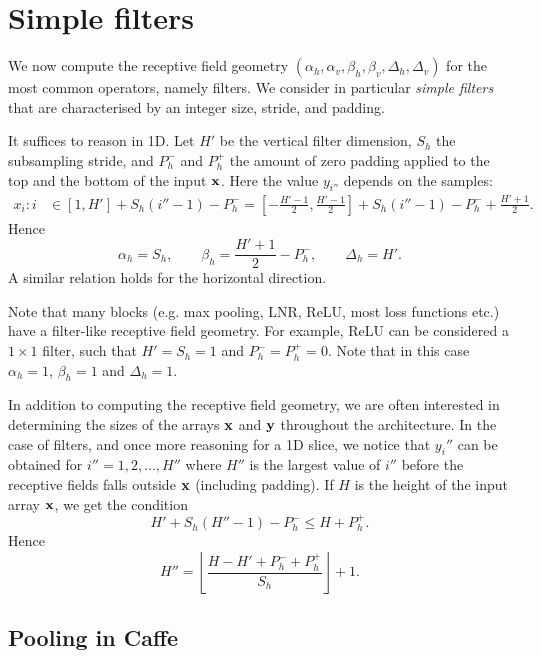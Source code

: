 \section{Simple filters}\label{s:receptive-simple-filters}

We now compute the receptive field geometry $(\alpha_h,\alpha_v,\beta_h,\beta_v,\Delta_h,\Delta_v)$ for the most common operators, namely filters. We consider in particular \emph{simple filters} that are characterised by an integer size, stride, and padding.

It suffices to reason in 1D.  Let $H'$ be the vertical filter dimension, $S_h$ the subsampling stride, and $P_h^-$ and $P_h^+$ the amount of zero padding applied to the top and the bottom of the input $\mathbf{x}$. Here the value $y_{i''}$ depends on the samples:
\begin{align*}
 x_i : i
 &\in
 [1, H'] + S_h (i'' - 1) - P_h^-
=
\left[-\frac{H'-1}{2}, \frac{H'-1}{2}\right] + S_h (i''-1) - P_h^- + \frac{H'+1}{2}.
\end{align*}
Hence
\[
\alpha_h = S_h,
\qquad
\beta _h = \frac{H'+1}{2} - P_h^-,
\qquad
\Delta_h = H'.
\]
A similar relation holds for the horizontal direction.

Note that many blocks (e.g. max pooling, LNR, ReLU, most loss functions etc.) have a filter-like receptive field geometry. For example, ReLU can be considered a $1 \times 1$ filter, such that $H'=S_h=1$ and $P_h^-=P_h^+ =0$. Note that in this case $\alpha_h=1$, $\beta_h=1$ and $\Delta_h=1$.

In addition to computing the receptive field geometry, we are often interested in determining the sizes of the arrays $\mathbf{x}$ and $\mathbf{y}$ throughout the architecture. In the case of filters, and once more reasoning for a 1D slice, we notice that $y_i''$ can be obtained for $i''=1,2,\dots,H''$ where $H''$ is the largest value of $i''$ before the receptive fields falls outside $\mathbf{x}$ (including padding). If $H$ is the height of the input array $\mathbf{x}$, we get the condition
\[
   H' + S_h (H'' - 1) - P_h^- \leq H + P_h^+.
\]
Hence
\begin{equation}\label{e:filtered-height}
   H'' = \left\lfloor \frac{H - H' + P_h^- + P_h^+}{S_h} \right\rfloor + 1.	
\end{equation}

\subsection{Pooling in Caffe}

